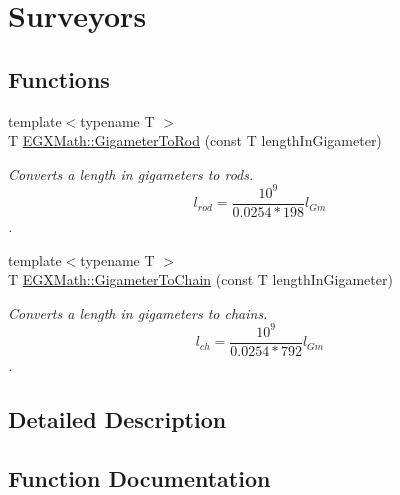 \hypertarget{group___e_g_x_math-_conversions-_length_conversions-_s_i-_gigameter-_surveyors}{}\section{Surveyors}
\label{group___e_g_x_math-_conversions-_length_conversions-_s_i-_gigameter-_surveyors}
\subsection*{Functions}
\begin{DoxyCompactItemize}
\item 
{\footnotesize template$<$typename T $>$ }\\T \mbox{\hyperlink{group___e_g_x_math-_conversions-_length_conversions-_s_i-_gigameter-_surveyors_ga73a408111b846e3cb97aa1990135ec46}{E\+G\+X\+Math\+::\+Gigameter\+To\+Rod}} (const T length\+In\+Gigameter)
\begin{DoxyCompactList}\small\item\em Converts a length in gigameters to rods. \[ l_{rod}= \frac{10^{9}}{0.0254 * 198} l_{Gm} \]. \end{DoxyCompactList}\item 
{\footnotesize template$<$typename T $>$ }\\T \mbox{\hyperlink{group___e_g_x_math-_conversions-_length_conversions-_s_i-_gigameter-_surveyors_ga1ed5bf3c72c4a51beebcddf4f7e87631}{E\+G\+X\+Math\+::\+Gigameter\+To\+Chain}} (const T length\+In\+Gigameter)
\begin{DoxyCompactList}\small\item\em Converts a length in gigameters to chains. \[ l_{ch}= \frac{10^{9}}{0.0254 * 792} l_{Gm} \]. \end{DoxyCompactList}\end{DoxyCompactItemize}


\subsection{Detailed Description}


\subsection{Function Documentation}
\mbox{\label{group___e_g_x_math-_conversions-_length_conversions-_s_i-_gigameter-_surveyors_ga1ed5bf3c72c4a51beebcddf4f7e87631}} 
